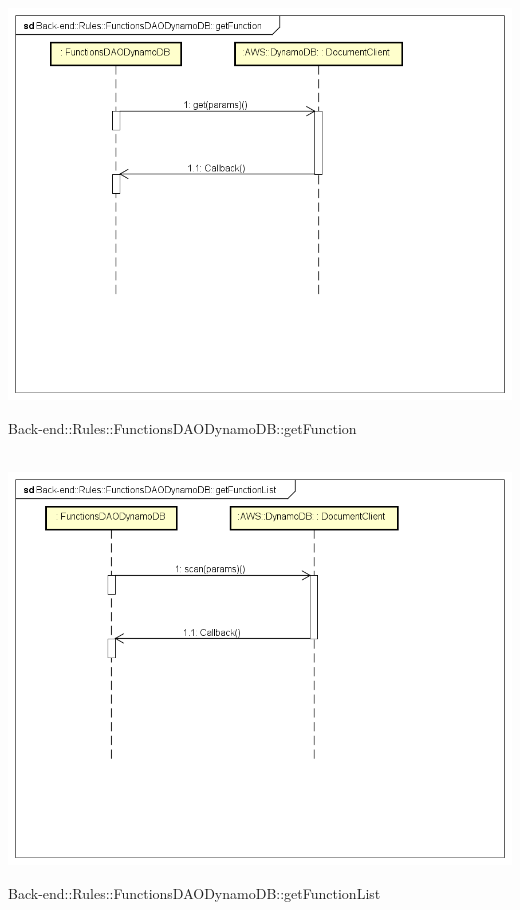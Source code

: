 \\ \includegraphics[width=\textwidth,height=\textheight,keepaspectratio]{images/diagrams/back-end/Ufficial_Backend/Back-end__Rules__FunctionsDAODynamoDB__getFunction.png} 	\caption{Back-end::Rules::FunctionsDAODynamoDB::getFunction}
\\ \includegraphics[width=\textwidth,height=\textheight,keepaspectratio]{images/diagrams/back-end/Ufficial_Backend/Back-end__Rules__FunctionsDAODynamoDB__getFunctionList.png} 	\caption{Back-end::Rules::FunctionsDAODynamoDB::getFunctionList}

